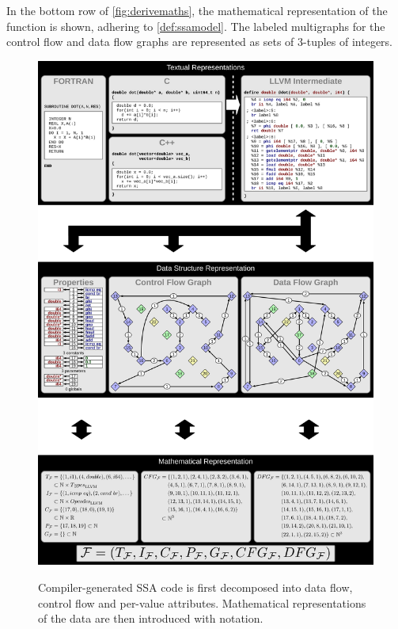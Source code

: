     In the bottom row of \autoref{fig:derivemaths}, the mathematical
    representation of the function is shown, adhering to \autoref{def:ssamodel}.
    The labeled multigraphs for the control flow and data flow graphs are
    represented as sets of $3$-tuples of integers.


\begin{figure}[p]
\centering
\includegraphics[width=\textwidth,height=1.5\textwidth]{figures/ssamathmodel.pdf}\\[9.3319pt]
\caption{Compiler-generated SSA code is first decomposed into data flow, control
         flow and per-value attributes.
         Mathematical representations of the data are then introduced with
         notation.}
\label{fig:derivemaths}
\end{figure}


